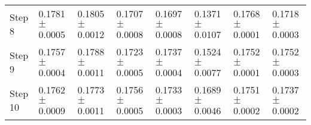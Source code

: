 \documentclass{ieeeaccess}
\begin{document}
\begin{table*}[htbp]
\begin{tabular}{llllllll}
Step 8 &  0.1781 $\pm$  0.0005 & 0.1805 $\pm$   0.0012  & 0.1707 $\pm$   0.0008  &  0.1697 $\pm$  0.0008 &  0.1371 $\pm$  0.0107  &  0.1768 $\pm$  0.0001 & 0.1718$\pm$ 	0.0003\\

Step 9 &  0.1757 $\pm$  0.0004 & 0.1788 $\pm$   0.0011  & 0.1723 $\pm$   0.0005  &  0.1737 $\pm$ 0.0004 &  0.1524 $\pm$  0.0077  &  0.1752 $\pm$  0.0001 &  	0.1752$\pm$ 	0.0003\\

Step 10 &  0.1762 $\pm$  0.0009 & 0.1773 $\pm$   0.0011  & 0.1756 $\pm$   0.0005  &  0.1733 $\pm$  0.0003 &  0.1689 $\pm$  0.0046  &  0.1751 $\pm$  0.0002 &  0.1737$\pm$ 	0.0002\\

\hline
 
\end{tabular}

\end{table*}
\end{document}
